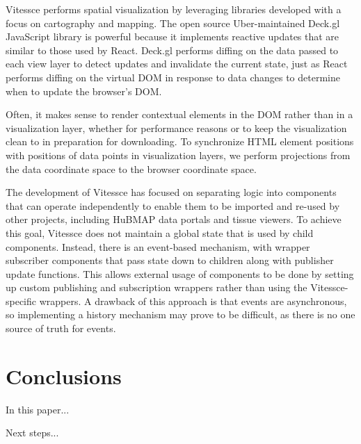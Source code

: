 \documentclass[12pt, letterpaper]{article}
\begin{document}
Vitessce performs spatial visualization by leveraging libraries developed with a focus on cartography and mapping.
The open source Uber-maintained Deck.gl JavaScript library is powerful because it implements reactive updates that are similar to those used by React.
Deck.gl performs diffing on the data passed to each view layer to detect updates and invalidate the current state, just as React performs diffing on the virtual DOM in response to data changes to determine when to update the browser's DOM.

Often, it makes sense to render contextual elements in the DOM rather than in a visualization layer, whether for performance reasons or to keep the visualization clean to in preparation for downloading.
To synchronize HTML element positions with positions of data points in visualization layers, we perform projections from the data coordinate space to the browser coordinate space.



The development of Vitessce has focused on separating logic into components that can operate independently to enable them to be imported and re-used by other projects, including HuBMAP data portals and tissue viewers.
To achieve this goal, Vitessce does not maintain a global state that is used by child components.
Instead, there is an event-based mechanism, with wrapper subscriber components that pass state down to children along with publisher update functions.
This allows external usage of components to be done by setting up custom publishing and subscription wrappers rather than using the Vitessce-specific wrappers.
A drawback of this approach is that events are asynchronous, so implementing a history mechanism may prove to be difficult, as there is no one source of truth for events.








\section{Conclusions}
In this paper...

Next steps...



{}

\end{document}
